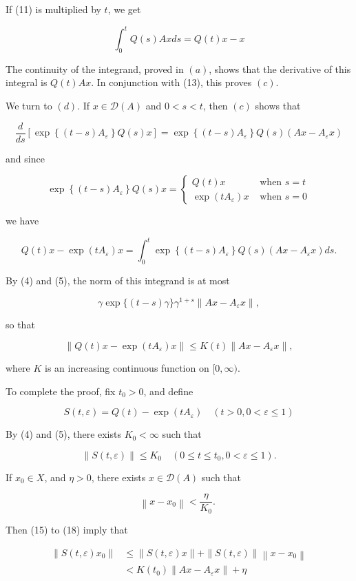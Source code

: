 \documentclass[10pt]{article}
\begin{document}
If (11) is multiplied by $t$, we get

$$
\int_{0}^{t} Q(s) A x d s=Q(t) x-x
$$

The continuity of the integrand, proved in $(a)$, shows that the derivative of this integral is $Q(t) A x$. In conjunction with (13), this proves $(c)$.

We turn to $(d)$. If $x \in \mathscr{D}(A)$ and $0<s<t$, then $(c)$ shows that

$$
\frac{d}{d s}\left[\exp \left\{(t-s) A_{\varepsilon}\right\} Q(s) x\right]=\exp \left\{(t-s) A_{\varepsilon}\right\} Q(s)\left(A x-A_{\varepsilon} x\right)
$$

and since

$$
\exp \left\{(t-s) A_{\varepsilon}\right\} Q(s) x= \begin{cases}Q(t) x & \text { when } s=t \\ \exp \left(t A_{\varepsilon}\right) x & \text { when } s=0\end{cases}
$$

we have

$$
Q(t) x-\exp \left(t A_{\varepsilon}\right) x=\int_{0}^{t} \exp \left\{(t-s) A_{\varepsilon}\right\} Q(s)\left(A x-A_{\varepsilon} x\right) d s .
$$

By (4) and (5), the norm of this integrand is at most

$$
\gamma \exp \{(t-s) \gamma\} \gamma^{1+s}\left\|A x-A_{\varepsilon} x\right\|,
$$

so that

$$
\left\|Q(t) x-\exp \left(t A_{\varepsilon}\right) x\right\| \leq K(t)\left\|A x-A_{\varepsilon} x\right\|,
$$

where $K$ is an increasing continuous function on $[0, \infty)$.

To complete the proof, fix $t_{0}>0$, and define

$$
S(t, \varepsilon)=Q(t)-\exp \left(t A_{\varepsilon}\right) \quad(t>0,0<\varepsilon \leq 1)
$$

By (4) and (5), there exists $K_{0}<\infty$ such that

$$
\|S(t, \varepsilon)\| \leq K_{0} \quad\left(0 \leq t \leq t_{0}, 0<\varepsilon \leq 1\right) .
$$

If $x_{0} \in X$, and $\eta>0$, there exists $x \in \mathscr{D}(A)$ such that

$$
\left\|x-x_{0}\right\|<\frac{\eta}{K_{0}} \text {. }
$$

Then (15) to (18) imply that

$$
\begin{aligned}
\left\|S(t, \varepsilon) x_{0}\right\| & \leq\|S(t, \varepsilon) x\|+\|S(t, \varepsilon)\|\left\|x-x_{0}\right\| \\
& <K\left(t_{0}\right)\left\|A x-A_{\varepsilon} x\right\|+\eta
\end{aligned}
$$
\end{document}
